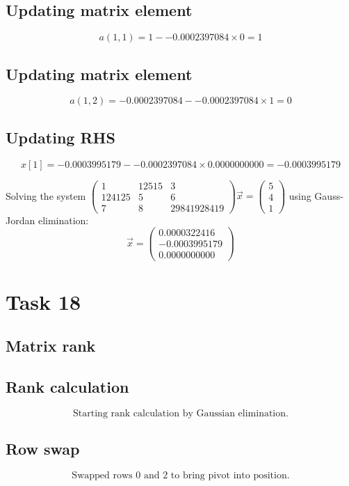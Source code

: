 \documentclass{article}
\begin{document}
\subsection*{ \vspace{1em} Updating matrix element}
\[
a(1,1 ) = 1 - -0.0002397084 \times 0 = 1
\]
\subsection*{ \vspace{1em} Updating matrix element}
\[
a(1,2 ) = -0.0002397084 - -0.0002397084 \times 1 = 0
\]
\subsection*{ \vspace{1em} Updating RHS}
\[
x[1] = -0.0003995179 - -0.0002397084 \times 0.0000000000 = -0.0003995179
\]
\medskip

Solving the system $\begin{pmatrix}1 & 12515 & 3 \\ 124125 & 5 & 6 \\ 7 & 8 & 29841928419\end{pmatrix}\vec{x} = \begin{pmatrix}5 \\ 4 \\ 1\end{pmatrix}$ using Gauss-Jordan elimination:
\[
\vec{x} = \begin{pmatrix}0.0000322416 \\ -0.0003995179 \\ 0.0000000000\end{pmatrix}
\]
\bigskip

\hrulefill
\bigskip

\section*{Task 18}

\subsection*{Matrix rank}
\subsection*{ \vspace{1em} Rank calculation}
\[
\text{Starting rank calculation by Gaussian elimination.}
\]
\subsection*{ \vspace{1em} Row swap}
\[
\text{Swapped rows } 0 \text{ and } 2 \text{ to bring pivot into position.}
\]
\end{document}
